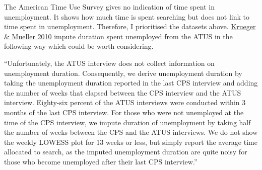 \documentclass[
]{article}
\begin{document}
The American Time Use Survey gives no indication of time spent in
unemployment. It shows how much time is spent searching but does not
link to time spent in unemployment. Therefore, I prioritised the
datasets above.
\href{https://www.sciencedirect.com/science/article/abs/pii/S0047272709001625}{Krueger
\& Mueller 2010} impute duration spent unemployed from the ATUS in the
following way which could be worth considering.

``Unfortunately, the ATUS interview does not collect information on
unemployment duration. Consequently, we derive unemployment duration by
taking the unemployment duration reported in the last CPS interview and
adding the number of weeks that elapsed between the CPS interview and
the ATUS interview. Eighty-six percent of the ATUS interviews were
conducted within 3 months of the last CPS interview. For those who were
not unemployed at the time of the CPS interview, we impute duration of
unemployment by taking half the number of weeks between the CPS and the
ATUS interviews. We do not show the weekly LOWESS plot for 13 weeks or
less, but simply report the average time allocated to search, as the
imputed unemployment duration are quite noisy for those who become
unemployed after their last CPS interview.''
\end{document}
